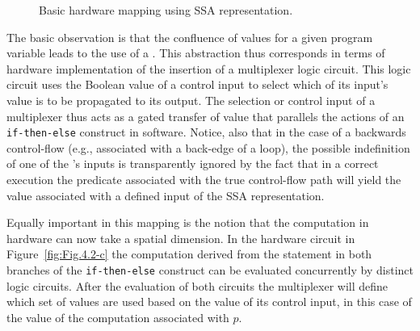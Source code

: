 \begin{figure}[htbp]
  \centering
\caption{Basic hardware mapping using SSA representation.}
\label{fig:Fig.4.2}
\end{figure}

The basic observation is that the confluence of values for a given program variable leads to the use of a \phifun. This \phifun abstraction thus corresponds in terms of hardware implementation of the insertion of a multiplexer logic circuit. This logic circuit uses the Boolean value of a control input to select which of its 
input's value is to be propagated to its output. The selection or control input of 
a multiplexer thus acts as a gated transfer of value that parallels the actions of 
an {\tt if-then-else} construct in software. Notice, also that in the case of a backwards control-flow (e.g., associated with a back-edge of a loop),  the possible indefinition of one of the  \phifun's inputs is transparently ignored by the fact that in a correct execution the predicate associated with the true control-flow path will yield the value associated with a defined input of the SSA representation.

Equally important in this mapping is the notion that the computation in hardware can now take a spatial dimension.  In the hardware circuit in Figure~\ref{fig:Fig.4.2-c} the computation derived from the statement in both branches of the {\tt if-then-else} construct can be evaluated concurrently by distinct logic circuits.  After the evaluation of both circuits the multiplexer will define which set of values are used based on the value of its control input, in this case of the value of the computation associated with $p$.


